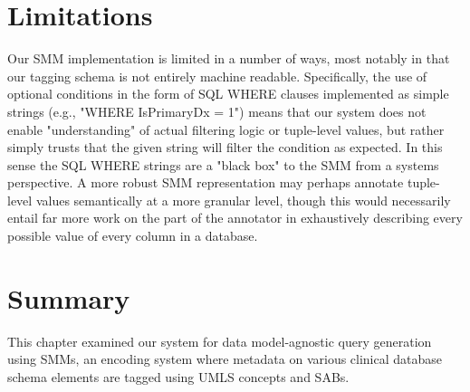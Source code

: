 \documentclass[../main.tex]{subfiles}
\begin{document}
\section{Limitations}

Our SMM implementation is limited in a number of ways, most notably in that our tagging schema is not entirely machine readable. Specifically, the use of optional conditions in the form of SQL WHERE clauses implemented as simple strings (e.g., "WHERE IsPrimaryDx = 1") means that our system does not enable "understanding" of actual filtering logic or tuple-level values, but rather simply trusts that the given string will filter the condition as expected. In this sense the SQL WHERE strings are a "black box" to the SMM from a systems perspective. A more robust SMM representation may perhaps annotate tuple-level values semantically at a more granular level, though this would necessarily entail far more work on the part of the annotator in exhaustively describing every possible value of every column in a database.

\section{Summary}

This chapter examined our system for data model-agnostic query generation using SMMs, an encoding system where metadata on various clinical database schema elements are tagged using UMLS concepts and SABs. 
\end{document}
